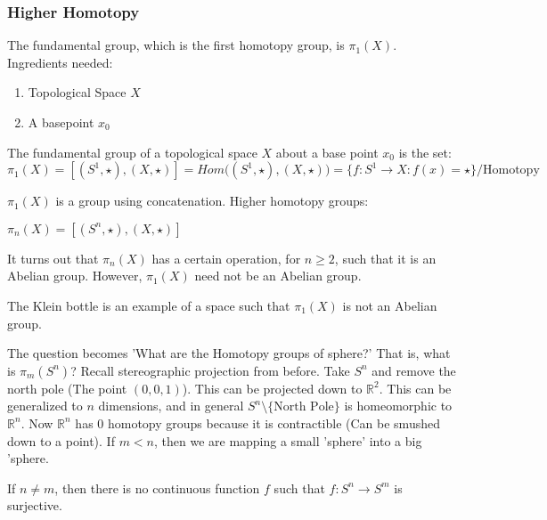 \documentclass[crop=false,class=book,oneside]{standalone}                      %
\begin{document}
            \subsubsection{Higher Homotopy}
                The fundamental group, which is the first homotopy group,
                is $\pi_{1}(X)$. Ingredients needed:
                \begin{enumerate}
                    \item Topological Space $X$
                    \item A basepoint $x_{0}$
                \end{enumerate}
            \begin{definition}
                The fundamental group of a topological space $X$ about a
                base point $x_{0}$ is the set:
                \begin{equation}
                    \pi_{1}(X)=[(S^{1},\star),(X,\star)]
                              =Hom\big((S^{1},\star),(X,\star)\big)
                              =\{f:S^{1}\rightarrow X:f(x)
                                    =\star\}/\textrm{Homotopy}
                \end{equation}
            \end{definition}
            $\pi_{1}(X)$ is a group using concatenation. Higher homotopy groups:
            \begin{definition}
            $\pi_{n}(X)=[(S^{n},\star),(X,\star)]$
            \end{definition}
            It turns out that $\pi_{n}(X)$ has a certain operation, for $n\geq 2$, such that it is an Abelian group. However, $\pi_{1}(X)$ need not be an Abelian group.
            \begin{example}
            The Klein bottle is an example of a space such that $\pi_{1}(X)$ is not an Abelian group.
            \end{example}
            The question becomes 'What are the Homotopy groups of sphere?' That is, what is $\pi_{m}(S^{n})$? Recall stereographic projection from before. Take $S^{n}$ and remove the north pole (The point $(0,0,1)$). This can be projected down to $\mathbb{R}^{2}$. This can be generalized to $n$ dimensions, and in general $S^{n}\setminus\{\textrm{North Pole}\}$ is homeomorphic to $\mathbb{R}^{n}$. Now $\mathbb{R}^{n}$ has $0$ homotopy groups because it is contractible (Can be smushed down to a point). If $m<n$, then we are mapping a small 'sphere' into a big 'sphere.
            \begin{theorem}
            If $n\ne m$, then there is no continuous function $f$ such that $f:S^{n}\rightarrow S^{m}$ is surjective.
            \end{theorem}
\end{document}
